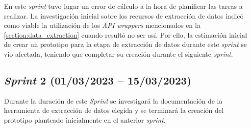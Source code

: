 En este \textit{sprint} tuvo lugar un error de cálculo a la hora de planificar las tareas a realizar. La investigación inicial sobre los recursos de extracción de datos indicó como viable la utilización de los \textit{API wrappers} mencionados en la \autoref{section:data_extraction} cuando resultó no ser así. Por ello, la estimación inicial de crear un prototipo para la etapa de extracción de datos durante este \textit{sprint} se vio afectada, teniendo que completar su creación durante el siguiente \textit{sprint}.



\subsection{\textit{Sprint} 2 (01/03/2023 -- 15/03/2023)}

Durante la duración de este \textit{Sprint} se investigará la documentación de la herramienta de extracción de datos elegida y se terminará la creación del prototipo planteado inicialmente en el anterior \textit{sprint}.

